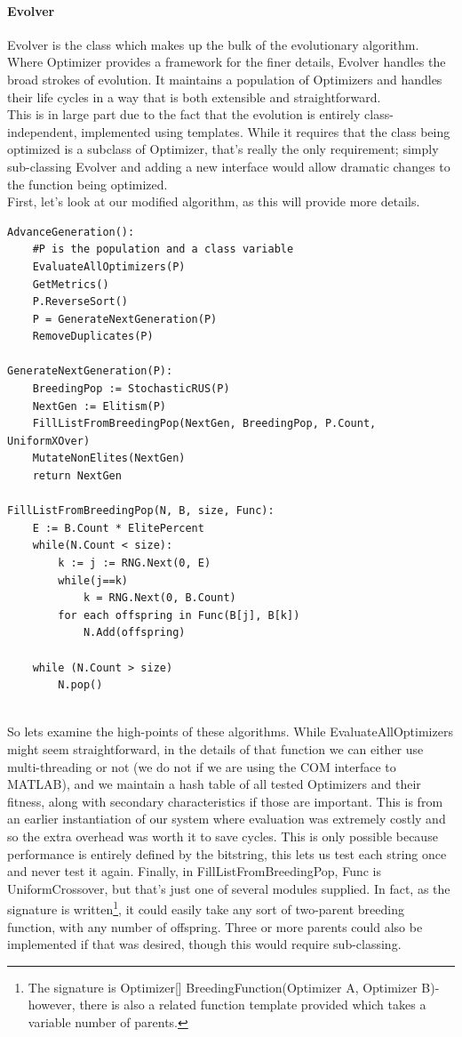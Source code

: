 \paragraph{Evolver}
Evolver is the class which makes up the bulk of the evolutionary algorithm.  Where Optimizer provides a framework for the finer details, Evolver handles the broad strokes of evolution.  It maintains a population of Optimizers and handles their life cycles in a way that is both extensible and straightforward.  \\This is in large part due to the fact that the evolution is entirely class-independent, implemented using templates. While it requires that the class being optimized is a subclass of Optimizer, that's really the only requirement; simply sub-classing Evolver and adding a new interface would allow dramatic changes to the function being optimized.\\First, let's look at our modified algorithm, as this will provide more details.
\begin{lstlisting}
AdvanceGeneration():
	#P is the population and a class variable 
	EvaluateAllOptimizers(P)
	GetMetrics()
	P.ReverseSort()
	P = GenerateNextGeneration(P)
	RemoveDuplicates(P)

GenerateNextGeneration(P):
	BreedingPop := StochasticRUS(P)
	NextGen := Elitism(P)
	FillListFromBreedingPop(NextGen, BreedingPop, P.Count, UniformXOver)
	MutateNonElites(NextGen)
	return NextGen
	
FillListFromBreedingPop(N, B, size, Func):
	E := B.Count * ElitePercent
	while(N.Count < size):
		k := j := RNG.Next(0, E)
		while(j==k) 
			k = RNG.Next(0, B.Count)
		for each offspring in Func(B[j], B[k])
			N.Add(offspring)

	while (N.Count > size)
		N.pop()
	
\end{lstlisting}
So lets examine the high-points of these algorithms.  While EvaluateAllOptimizers might seem straightforward, in the details of that function we can either use multi-threading or not (we do not if we are using the COM interface to MATLAB), and we maintain a hash table of all tested Optimizers and their fitness, along with secondary characteristics if those are important.  This is from an earlier instantiation of our system where evaluation was extremely costly and so the extra overhead was worth it to save cycles. This is only possible because performance is entirely defined by the bitstring, this lets us test each string once and never test it again.  Finally, in FillListFromBreedingPop,  Func is UniformCrossover, but that's just one of several modules supplied.  In fact, as the signature is written\footnote{The signature is Optimizer[] BreedingFunction(Optimizer A, Optimizer B)- however, there is also a related function template provided which takes a variable number of parents.}, it could easily take any sort of two-parent breeding function, with any number of offspring.  Three or more parents could also be implemented if that was desired, though this would require sub-classing.\\
